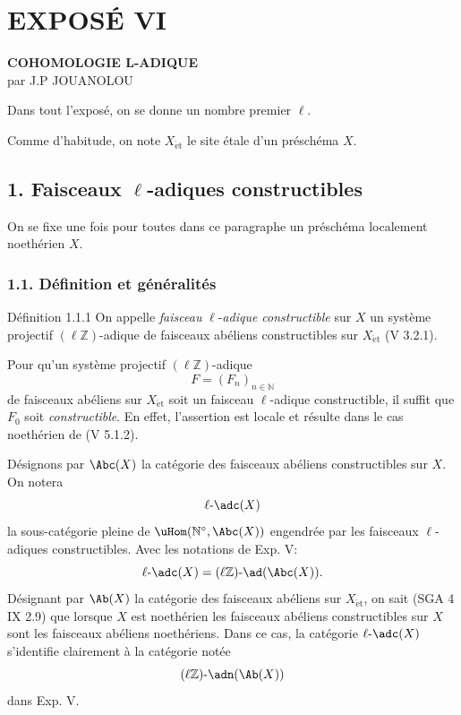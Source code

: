 \renewenvironment{prooftext}[1][Proof]{\par\noindent\emph{#1.}\ }{\par\medskip}
\section*{EXPOSÉ VI}

\begin{center}
\textbf{COHOMOLOGIE L-ADIQUE}\\[0.5em]
par J.P JOUANOLOU
\end{center}

Dans tout l'exposé, on se donne un nombre premier \(\ell\).

Comme d'habitude, on note \(X_{\mathrm{\acute et}}\) le site étale d'un préschéma \(X\).

\subsection*{1. Faisceaux \(\ell\)-adiques constructibles}

On se fixe une fois pour toutes dans ce paragraphe un préschéma localement noethérien \(X\).

\subsubsection*{1.1. Définition et généralités}

\begin{statement}{Définition 1.1.1}
On appelle \emph{faisceau} \(\ell\)-\emph{adique constructible} sur \(X\) un système projectif \((\ell\mathbb{Z})\)-adique de faisceaux abéliens constructibles sur \(X_{\mathrm{\acute et}}\) (V 3.2.1).
\end{statement}

Pour qu'un système projectif \((\ell\mathbb{Z})\)-adique
\[
F=(F_n)_{n\in\mathbb{N}}
\]
de faisceaux abéliens sur \(X_{\mathrm{\acute et}}\) soit un faisceau \(\ell\)-adique constructible, il suffit que \(F_0\) soit \emph{constructible}. En effet, l'assertion est locale et résulte dans le cas noethérien de (V 5.1.2).

Désignons par \(\Abc(X)\) la catégorie des faisceaux abéliens constructibles sur \(X\). On notera
\[
\ell\text{-}\adc(X)
\]
la sous-catégorie pleine de \(\uHom(\mathbb{N}^{\circ},\Abc(X))\) engendrée par les faisceaux
\(\ell\)-adiques constructibles. Avec les notations de Exp. V:
\[
\ell\text{-}\adc(X)=(\ell\mathbb{Z})\text{-}\ad(\Abc(X)).
\]
Désignant par \(\Ab(X)\) la catégorie des faisceaux abéliens sur \(X_{\mathrm{\acute et}}\), on sait (SGA 4 IX 2.9) que lorsque \(X\) est noethérien les faisceaux abéliens constructibles sur \(X\) sont les faisceaux abéliens noethériens. Dans ce cas, la catégorie \(\ell\text{-}\adc(X)\) s'identifie clairement à la catégorie notée
\[
(\ell\mathbb{Z})\text{-}\adn(\Ab(X))
\]
dans Exp. V.

